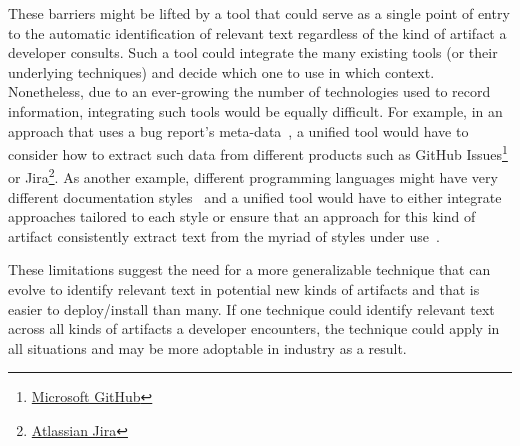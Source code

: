 These barriers might be lifted by a tool that could serve as a single point of entry to the automatic identification of relevant text regardless of the kind of artifact a developer consults.
Such a tool could integrate the many existing tools (or their underlying techniques) and decide which one 
to use in which context. Nonetheless, 
due to an ever-growing the number of technologies used to record information,
integrating such tools would be equally difficult.
For example, in an approach that uses a bug report's meta-data~\cite{Lotufo2012,li2018deep}, a 
unified tool would have to 
consider how to extract such data from different products 
such as 
GitHub Issues\footnote{\href{https://docs.github.com/en/issues/tracking-your-work-with-issues/about-issues}{Microsoft GitHub}} 
or Jira\footnote{\href{https://www.atlassian.com/software/jira}{Atlassian Jira}}.
As another example, different programming languages
might have very different documentation styles~\cite{endrikat2014} and a 
unified tool would have to either integrate approaches tailored to each style  
or ensure that an approach for this kind of artifact
consistently 
extract text from the myriad of styles under use~\cite{robillard2011field}.







These limitations suggest the need for a more generalizable technique
that can evolve to 
identify relevant text in potential new kinds of artifacts 
and that is easier to deploy/install than many.
If one technique could identify relevant text across all kinds
of artifacts a developer encounters, the technique
could apply in all situations and may be more adoptable in industry
as a result. 

















